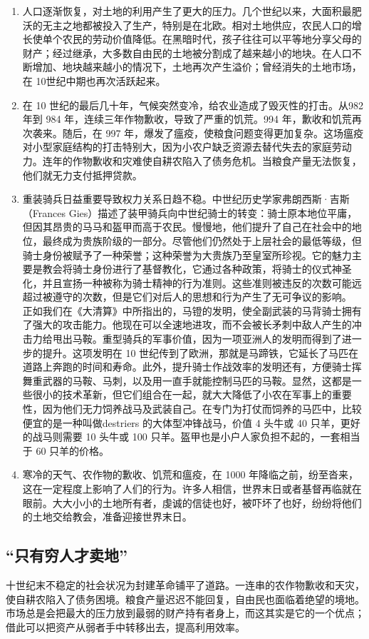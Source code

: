 \begin{enumerate}
    \item 人口逐渐恢复，对土地的利用产生了更大的压力。几个世纪以来，大面积最肥沃的无主之地都被投入了生产，特别是在北欧。相对土地供应，农民人口的增长使单个农民的劳动价值降低。在黑暗时代，孩子往往可以平等地分享父母的财产；经过继承，大多数自由民的土地被分割成了越来越小的地块。在人口不断增加、地块越来越小的情况下，土地再次产生溢价；曾经消失的土地市场，在 10世纪中期也再次活跃起来。
    \item 在 10 世纪的最后几十年，气候突然变冷，给农业造成了毁灭性的打击。从982 年到 984 年，连续三年作物歉收，导致了严重的饥荒。994 年，歉收和饥荒再次袭来。随后，在 997 年，爆发了瘟疫，使粮食问题变得更加复杂。这场瘟疫对小型家庭结构的打击特别大，因为小农户缺乏资源去替代失去的家庭劳动力。连年的作物歉收和灾难使自耕农陷入了债务危机。当粮食产量无法恢复，他们就无力支付抵押贷款。
    \item 重装骑兵日益重要导致权力关系日趋不稳。中世纪历史学家弗朗西斯·吉斯（Frances Gies）描述了装甲骑兵向中世纪骑士的转变：骑士原本地位平庸，但因其昂贵的马马和盔甲而高于农民。慢慢地，他们提升了自己在社会中的地位，最终成为贵族阶级的一部分。尽管他们仍然处于上层社会的最低等级，但骑士身份被赋予了一种荣誉；这种荣誉为大贵族乃至皇室所珍视。它的魅力主要是教会将骑士身份进行了基督教化，它通过各种政策，将骑士的仪式神圣化，并且宣扬一种被称为骑士精神的行为准则。这些准则被违反的次数可能远超过被遵守的次数，但是它们对后人的思想和行为产生了无可争议的影响。 正如我们在《大清算》中所指出的，马镫的发明，使全副武装的马背骑士拥有了强大的攻击能力。他现在可以全速地进攻，而不会被长矛刺中敌人产生的冲击力给甩出马鞍。重型骑兵的军事价值，因为一项亚洲人的发明而得到了进一步的提升。这项发明在 10 世纪传到了欧洲，那就是马蹄铁，它延长了马匹在道路上奔跑的时间和寿命。此外，提升骑士作战效率的发明还有，方便骑士挥舞重武器的马鞍、马刺，以及用一直手就能控制马匹的马鞍。显然，这都是一些很小的技术革新，但它们组合在一起，就大大降低了小农在军事上的重要性，因为他们无力饲养战马及武装自己。在专门为打仗而饲养的马匹中，比较便宜的是一种叫做destriers 的大体型冲锋战马，价值 4 头牛或 40 只羊，更好的战马则需要 10 头牛或 100 只羊。盔甲也是小户人家负担不起的，一套相当于 60 只羊的价格。
    \item 寒冷的天气、农作物的歉收、饥荒和瘟疫，在 1000 年降临之前，纷至沓来，这在一定程度上影响了人们的行为。许多人相信，世界末日或者基督再临就在眼前。大大小小的土地所有者，虔诚的信徒也好，被吓坏了也好，纷纷将他们的土地交给教会，准备迎接世界末日。
\end{enumerate}

\subsection{“只有穷人才卖地”}
十世纪末不稳定的社会状况为封建革命铺平了道路。一连串的农作物歉收和天灾，使自耕农陷入了债务困境。粮食产量迟迟不能回复，自由民也面临着绝望的境地。市场总是会把最大的压力放到最弱的财产持有者身上，而这其实是它的一个优点；借此可以把资产从弱者手中转移出去，提高利用效率。

